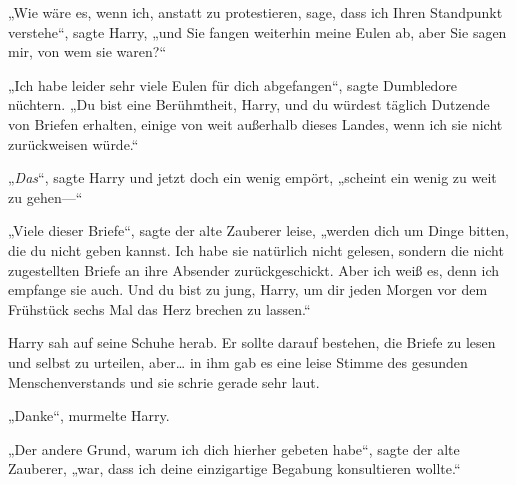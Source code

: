 „Wie wäre es, wenn ich, anstatt zu protestieren, sage, dass ich Ihren Standpunkt verstehe“, sagte Harry, „und Sie fangen weiterhin meine Eulen ab, aber Sie sagen mir, von wem sie waren?“

„Ich habe leider sehr viele Eulen für dich abgefangen“, sagte Dumbledore nüchtern. „Du bist eine Berühmtheit, Harry, und du würdest täglich Dutzende von Briefen erhalten, einige von weit außerhalb dieses Landes, wenn ich sie nicht zurückweisen würde.“

„\emph{Das}“, sagte Harry und jetzt doch ein wenig empört, „scheint ein wenig zu weit zu gehen—“

„Viele dieser Briefe“, sagte der alte Zauberer leise, „werden dich um Dinge bitten, die du nicht geben kannst. Ich habe sie natürlich nicht gelesen, sondern die nicht zugestellten Briefe an ihre Absender zurückgeschickt. Aber ich weiß es, denn ich empfange sie auch. Und du bist zu jung, Harry, um dir jeden Morgen vor dem Frühstück sechs Mal das Herz brechen zu lassen.“

Harry sah auf seine Schuhe herab. Er sollte darauf bestehen, die Briefe zu lesen und selbst zu urteilen, aber… in ihm gab es eine leise Stimme des gesunden Menschenverstands und sie schrie gerade sehr laut.

„Danke“, murmelte Harry.

„Der andere Grund, warum ich dich hierher gebeten habe“, sagte der alte Zauberer, „war, dass ich deine einzigartige Begabung konsultieren wollte.“

